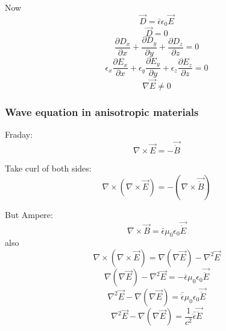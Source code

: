 \documentclass[10pt]{article}
\begin{document}
Now
\begin{equation*}
\vec{D} = \bar{\epsilon} \epsilon_0 \vec{E}
\end{equation*}
\begin{equation*}
\vec{D} = 0
\end{equation*}
\begin{equation*}
\frac{\partial D_x}{\partial x} + \frac{\partial D_y}{\partial y} + \frac{\partial D_z}{\partial z} = 0
\end{equation*}
\begin{equation*}
\epsilon_x \frac{\partial E_x}{\partial x} + \epsilon_y \frac{\partial E_y}{\partial y} + \epsilon_z \frac{\partial E_z}{\partial z} = 0
\end{equation*}
\begin{equation*}
\nabla \vec{E} \neq 0
\end{equation*}

\subsubsection{Wave equation in anisotropic materials}
Fraday:
\begin{equation*}
\nabla \times \vec{E} = - \vec{\dot{B}}
\end{equation*}

Take curl of both sides:
\begin{equation*}
\nabla \times (\nabla \times \vec{E}) = - (\nabla \times \vec{\dot{B}})
\end{equation*}

But Ampere:
\begin{equation*}
\nabla \times \vec{B} = \bar{\epsilon} \mu_0 \epsilon_0 \vec{\dot{E}}
\end{equation*}
also
\begin{equation*}
\nabla \times (\nabla \times \vec{E}) = \nabla (\nabla \vec{E}) - \nabla^2 \vec{E}
\end{equation*}
\begin{equation*}
\nabla (\nabla \vec{E}) - \nabla^2 \vec{E} = - \bar{\epsilon} \mu_0 \epsilon_0 \vec{\ddot{E}}
\end{equation*}
\begin{equation}\boxed{
\nabla^2 \vec{E} - \nabla (\nabla \vec{E}) = \bar{\ddot{\epsilon}} \mu_0 \epsilon_0 \vec{\ddot{E}}
}\end{equation}
\begin{equation*}
\nabla^2 \vec{E} - \nabla (\nabla \vec{E}) = \frac{1}{c^2}\bar{\ddot{\epsilon}}\vec{\ddot{E}}
\end{equation*}
\end{document}
